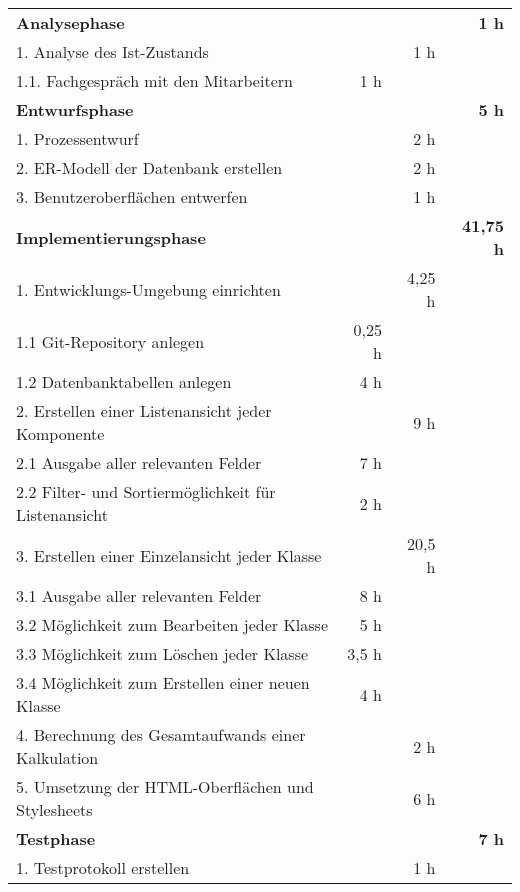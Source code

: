 \begin{tabularx}{\textwidth}{Xrrr}
\rowcolor{heading}\textbf{Analysephase} & \textbf{} & \textbf{} & \textbf{1 h} \\
1. Analyse des Ist-Zustands &       & 1 h   &  \\
\rowcolor{odd}1.1. Fachgespräch mit den Mitarbeitern & 1 h   &       &  \\
\rowcolor{heading}\textbf{Entwurfsphase} & \textbf{} & \textbf{} & \textbf{5 h} \\
1. Prozessentwurf &       & 2 h   &  \\
\rowcolor{odd}2. ER-Modell der Datenbank erstellen &       & 2 h   &  \\
3. Benutzeroberflächen entwerfen &       & 1 h   &  \\
\rowcolor{heading}\textbf{Implementierungsphase} & \textbf{} & \textbf{} &
\textbf{41,75 h} \\
\rowcolor{odd}1. Entwicklungs-Umgebung einrichten &       & 4,25 h  
&  \\
1.1 Git-Repository anlegen &   0,25 h    &    &  \\
\rowcolor{odd}1.2 Datenbanktabellen anlegen &   4 h    &    &  \\
2. Erstellen einer Listenansicht jeder Komponente  &   &  9 h  &  \\
\rowcolor{odd}2.1 Ausgabe aller relevanten Felder & 7 h   &    
&  \\
2.2 Filter- und Sortiermöglichkeit für Listenansicht & 2 h   &  &  \\
\rowcolor{odd}3. Erstellen einer Einzelansicht jeder Klasse &   & 20,5 h &  \\
3.1 Ausgabe aller relevanten Felder & 8 h   &  &  \\
\rowcolor{odd}3.2 Möglichkeit zum Bearbeiten jeder Klasse & 5 h   &    & \\
3.3 Möglichkeit zum Löschen jeder Klasse & 3,5 h   &   &  \\
\rowcolor{odd}3.4 Möglichkeit zum Erstellen einer neuen Klasse & 4 h &  &
\\
4. Berechnung des Gesamtaufwands einer Kalkulation &  &  2 h  & \\
\rowcolor{odd}5. Umsetzung der HTML-Oberflächen und Stylesheets &       & 6 h  
&  \\
\rowcolor{heading}\textbf{Testphase} & \textbf{} & \textbf{} & \textbf{7 h} \\
1. Testprotokoll erstellen &       & 1 h   &  \\

\end{tabularx}
